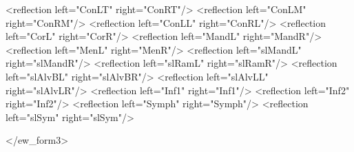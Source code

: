 \begin{DoxyVerbInclude}
<reflection left="ConLT" right="ConRT"/>
<reflection left="ConLM" right="ConRM"/>
<reflection left="ConLL" right="ConRL"/>
<reflection left="CorL" right="CorR"/>
<reflection left="MandL" right="MandR"/>
<reflection left="MenL" right="MenR"/>
<reflection left="slMandL" right="slMandR"/>
<reflection left="slRamL" right="slRamR"/>
<reflection left="slAlvBL" right="slAlvBR"/>
<reflection left="slAlvLL" right="slAlvLR"/>
<reflection left="Inf1" right="Inf1"/>
<reflection left="Inf2" right="Inf2"/>
<reflection left="Symph" right="Symph"/>
<reflection left="slSym" right="slSym"/>

</ew_form3>
\end{DoxyVerbInclude}
 